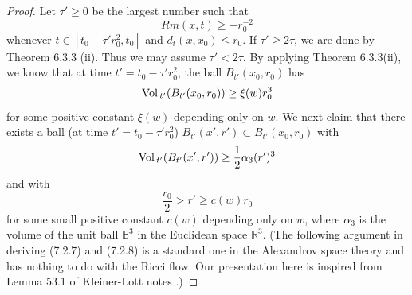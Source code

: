 \begin{proof}
Let $\tau'\geq0$ be the largest number such that \begin{equation}
Rm(x,t)\geq-r_0^{-2}  %
\end{equation} whenever $t\in[t_0-\tau'r_0^2,t_0]$ and $d_t(x,x_0)\leq r_0$.
If $\tau'\geq2\tau$, we are done by Theorem 6.3.3 (ii). Thus we
may assume $\tau'<2\tau$.  By applying Theorem 6.3.3(ii), we know
that at time $t'=t_0-\tau'r_0^2$, the ball $B_{t'}(x_0,r_0)$ has
\begin{equation}
\Vol_{t'}(B_{t'}(x_0,r_0))\geq \xi(w) r_0^3 %
\end{equation} for some positive constant $\xi(w)$ depending only on $w$. We
next claim that there exists a ball (at time $t'=t_0-\tau'r_0^2$)
$B_{t'}(x',r')\subset B_{t'}(x_0,r_0)$ with \begin{equation}
\Vol_{t'}(B_{t'}(x',r'))\geq\frac{1}{2}\alpha_3(r')^3 %
\end{equation} and with \begin{equation}
\frac{r_0}{2} > r'\geq c(w)r_0 %
\end{equation} for some small positive constant $c(w)$ depending only on $w$,
where $\alpha_3$ is  the volume of the unit ball $\mathbb{B}^3$ in
the Euclidean space $\mathbb{R}^3$. (The following argument in
deriving (7.2.7) and (7.2.8) is a standard one in the Alexandrov
space theory and has nothing to do with the Ricci flow. Our
presentation here is inspired from Lemma 53.1 of Kleiner-Lott notes
\cite{KL}.)


\end{proof}
